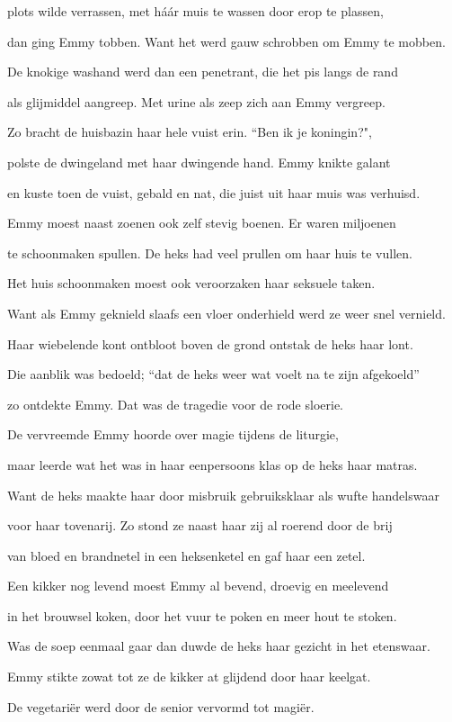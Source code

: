 plots wilde verrassen,
met háár muis te wassen
door erop te plassen,

dan ging Emmy tobben.
Want het werd gauw schrobben
om Emmy te mobben.

De knokige washand
werd dan een penetrant,
die het pis langs de rand

als glijmiddel aangreep.
Met urine als zeep
zich aan Emmy vergreep.

Zo bracht de huisbazin
haar hele vuist erin.
“Ben ik je koningin?",

polste de dwingeland
met haar dwingende hand.
Emmy knikte galant

en kuste toen de vuist,
gebald en nat, die juist
uit haar muis was verhuisd.

Emmy moest naast zoenen
ook zelf stevig boenen.
Er waren miljoenen

te schoonmaken spullen.
De heks had veel prullen
om haar huis te vullen.

Het huis schoonmaken
moest ook veroorzaken
haar seksuele taken.

Want als Emmy geknield
slaafs een vloer onderhield
werd ze weer snel vernield.

Haar wiebelende kont
ontbloot boven de grond
ontstak de heks haar lont.

Die aanblik was bedoeld;
“dat de heks weer wat voelt
na te zijn afgekoeld”

zo ontdekte Emmy.
Dat was de tragedie
voor de rode sloerie.

De vervreemde Emmy
hoorde over magie
tijdens de liturgie,

maar leerde wat het was
in haar eenpersoons klas
op de heks haar matras.

Want de heks maakte haar
door misbruik gebruiksklaar
als wufte handelswaar

voor haar tovenarij.
Zo stond ze naast haar zij
al roerend door de brij

van bloed en brandnetel
in een heksenketel
en gaf haar een zetel.

Een kikker nog levend
moest Emmy al bevend,
droevig en meelevend

in het brouwsel koken,
door het vuur te poken
en meer hout te stoken.

Was de soep eenmaal gaar
dan duwde de heks haar
gezicht in het etenswaar.

Emmy stikte zowat
tot ze de kikker at
glijdend door haar keelgat.

De vegetariër
werd door de senior
vervormd tot magiër.

